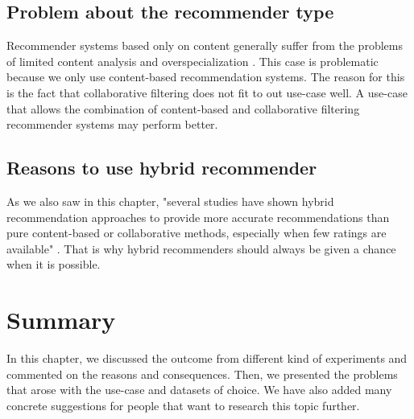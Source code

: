 \subsection{Problem about the recommender type}

Recommender systems based only on content generally suffer from the problems of limited content analysis and overspecialization \cite{shardanand1995social}. This case is problematic because we only use content-based recommendation systems. The reason for this is the fact that collaborative filtering does not fit to out use-case well. A use-case that allows the combination of content-based and collaborative filtering recommender systems may perform better.

\subsection{Reasons to use hybrid recommender}

As we also saw in this chapter, "several studies have shown hybrid recommendation approaches to provide more accurate recommendations than pure content-based or collaborative methods, especially when few ratings are available" \cite{adomavicius2005toward}. That is why hybrid recommenders should always be given a chance when it is possible.


\section{Summary}

In this chapter, we discussed the outcome from different kind of experiments and commented on the reasons and consequences. Then, we presented the problems that arose with the use-case and datasets of choice. We have also added many concrete suggestions for people that want to research this topic further.
